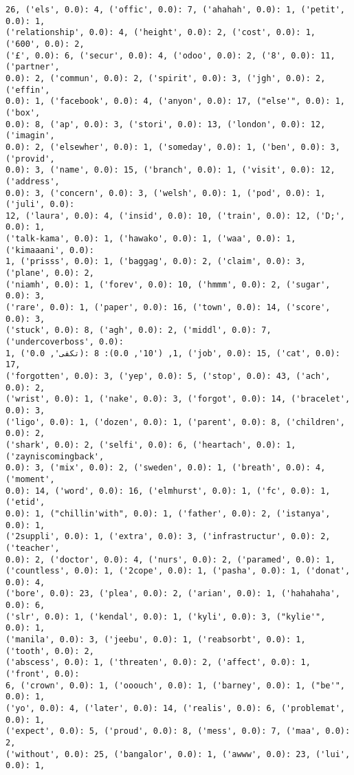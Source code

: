 \documentclass[11pt]{article}
\begin{document}
\begin{Verbatim}[commandchars=\\\{\}]
26, ('els', 0.0): 4, ('offic', 0.0): 7, ('ahahah', 0.0): 1, ('petit', 0.0): 1,
('relationship', 0.0): 4, ('height', 0.0): 2, ('cost', 0.0): 1, ('600', 0.0): 2,
('£', 0.0): 6, ('secur', 0.0): 4, ('odoo', 0.0): 2, ('8', 0.0): 11, ('partner',
0.0): 2, ('commun', 0.0): 2, ('spirit', 0.0): 3, ('jgh', 0.0): 2, ('effin',
0.0): 1, ('facebook', 0.0): 4, ('anyon', 0.0): 17, ("else'", 0.0): 1, ('box',
0.0): 8, ('ap', 0.0): 3, ('stori', 0.0): 13, ('london', 0.0): 12, ('imagin',
0.0): 2, ('elsewher', 0.0): 1, ('someday', 0.0): 1, ('ben', 0.0): 3, ('provid',
0.0): 3, ('name', 0.0): 15, ('branch', 0.0): 1, ('visit', 0.0): 12, ('address',
0.0): 3, ('concern', 0.0): 3, ('welsh', 0.0): 1, ('pod', 0.0): 1, ('juli', 0.0):
12, ('laura', 0.0): 4, ('insid', 0.0): 10, ('train', 0.0): 12, ('D;', 0.0): 1,
('talk-kama', 0.0): 1, ('hawako', 0.0): 1, ('waa', 0.0): 1, ('kimaaani', 0.0):
1, ('prisss', 0.0): 1, ('baggag', 0.0): 2, ('claim', 0.0): 3, ('plane', 0.0): 2,
('niamh', 0.0): 1, ('forev', 0.0): 10, ('hmmm', 0.0): 2, ('sugar', 0.0): 3,
('rare', 0.0): 1, ('paper', 0.0): 16, ('town', 0.0): 14, ('score', 0.0): 3,
('stuck', 0.0): 8, ('agh', 0.0): 2, ('middl', 0.0): 7, ('undercoverboss', 0.0):
1, ('تكفى', 0.0): 1, ('10', 0.0): 8, ('job', 0.0): 15, ('cat', 0.0): 17,
('forgotten', 0.0): 3, ('yep', 0.0): 5, ('stop', 0.0): 43, ('ach', 0.0): 2,
('wrist', 0.0): 1, ('nake', 0.0): 3, ('forgot', 0.0): 14, ('bracelet', 0.0): 3,
('ligo', 0.0): 1, ('dozen', 0.0): 1, ('parent', 0.0): 8, ('children', 0.0): 2,
('shark', 0.0): 2, ('selfi', 0.0): 6, ('heartach', 0.0): 1, ('zayniscomingback',
0.0): 3, ('mix', 0.0): 2, ('sweden', 0.0): 1, ('breath', 0.0): 4, ('moment',
0.0): 14, ('word', 0.0): 16, ('elmhurst', 0.0): 1, ('fc', 0.0): 1, ('etid',
0.0): 1, ("chillin'with", 0.0): 1, ('father', 0.0): 2, ('istanya', 0.0): 1,
('2suppli', 0.0): 1, ('extra', 0.0): 3, ('infrastructur', 0.0): 2, ('teacher',
0.0): 2, ('doctor', 0.0): 4, ('nurs', 0.0): 2, ('paramed', 0.0): 1,
('countless', 0.0): 1, ('2cope', 0.0): 1, ('pasha', 0.0): 1, ('donat', 0.0): 4,
('bore', 0.0): 23, ('plea', 0.0): 2, ('arian', 0.0): 1, ('hahahaha', 0.0): 6,
('slr', 0.0): 1, ('kendal', 0.0): 1, ('kyli', 0.0): 3, ("kylie'", 0.0): 1,
('manila', 0.0): 3, ('jeebu', 0.0): 1, ('reabsorbt', 0.0): 1, ('tooth', 0.0): 2,
('abscess', 0.0): 1, ('threaten', 0.0): 2, ('affect', 0.0): 1, ('front', 0.0):
6, ('crown', 0.0): 1, ('ooouch', 0.0): 1, ('barney', 0.0): 1, ("be'", 0.0): 1,
('yo', 0.0): 4, ('later', 0.0): 14, ('realis', 0.0): 6, ('problemat', 0.0): 1,
('expect', 0.0): 5, ('proud', 0.0): 8, ('mess', 0.0): 7, ('maa', 0.0): 2,
('without', 0.0): 25, ('bangalor', 0.0): 1, ('awww', 0.0): 23, ('lui', 0.0): 1,

\end{Verbatim}
\end{document}
